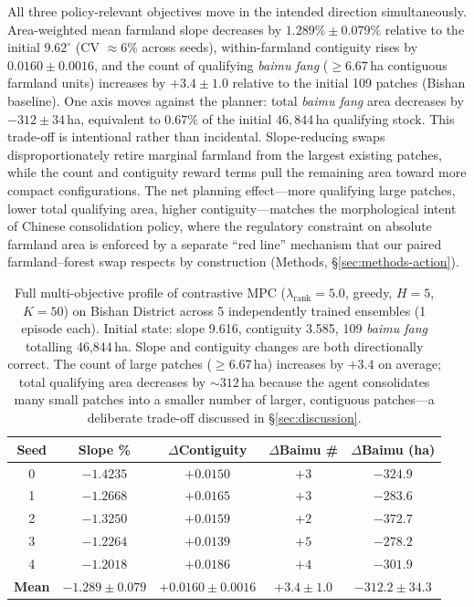 \documentclass[11pt]{article}
\begin{document}
All three policy-relevant objectives move in the intended direction simultaneously. Area-weighted mean farmland slope decreases by $1.289\% \pm 0.079\%$ relative to the initial $9.62^{\circ}$ (CV $\approx 6\%$ across seeds), within-farmland contiguity rises by $0.0160 \pm 0.0016$, and the count of qualifying \textit{baimu fang} ($\geq 6.67$\,ha contiguous farmland units) increases by $+3.4 \pm 1.0$ relative to the initial 109 patches (Bishan baseline). One axis moves against the planner: total \textit{baimu fang} area decreases by $-312 \pm 34$\,ha, equivalent to $0.67\%$ of the initial $46{,}844$\,ha qualifying stock. This trade-off is intentional rather than incidental. Slope-reducing swaps disproportionately retire marginal farmland from the largest existing patches, while the count and contiguity reward terms pull the remaining area toward more compact configurations. The net planning effect---more qualifying large patches, lower total qualifying area, higher contiguity---matches the morphological intent of Chinese consolidation policy, where the regulatory constraint on absolute farmland area is enforced by a separate ``red line'' mechanism that our paired farmland--forest swap respects by construction (Methods, \S\ref{sec:methods-action}).

\begin{table}[htbp]
\centering
\small
\caption{Full multi-objective profile of contrastive MPC ($\lambda_{\text{rank}}{=}5.0$, greedy, $H{=}5$, $K{=}50$) on Bishan District across 5 independently trained ensembles (1 episode each). Initial state: slope 9.616, contiguity 3.585, 109 \textit{baimu fang} totalling 46{,}844\,ha. Slope and contiguity changes are both directionally correct. The count of large patches ($\geq$6.67\,ha) increases by $+3.4$ on average; total qualifying area decreases by $\sim$$312$\,ha because the agent consolidates many small patches into a smaller number of larger, contiguous patches---a deliberate trade-off discussed in \S\ref{sec:discussion}.}
\label{tab:contrastive-multiobj}
\begin{tabular}{ccccc}
\toprule
Seed & Slope \% & $\Delta$Contiguity & $\Delta$Baimu \# & $\Delta$Baimu (ha) \\
\midrule
0 & $-1.4235$ & $+0.0150$ & $+3$ & $-324.9$ \\
1 & $-1.2668$ & $+0.0165$ & $+3$ & $-283.6$ \\
2 & $-1.3250$ & $+0.0159$ & $+2$ & $-372.7$ \\
3 & $-1.2264$ & $+0.0139$ & $+5$ & $-278.2$ \\
4 & $-1.2018$ & $+0.0186$ & $+4$ & $-301.9$ \\
\midrule
\textbf{Mean} & $\mathbf{-1.289 \pm 0.079}$ & $\mathbf{+0.0160 \pm 0.0016}$ & $\mathbf{+3.4 \pm 1.0}$ & $\mathbf{-312.2 \pm 34.3}$ \\
\bottomrule
\end{tabular}
\end{table}
\end{document}
